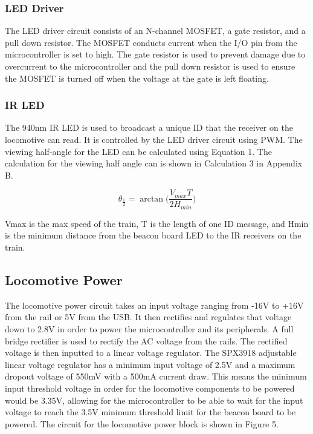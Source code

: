 \documentclass[openbib,letterpaper,10pt]{article}
\begin{document}
\begin{spacing}{1.15}
\subsubsection{LED Driver}
The LED driver circuit consists of an N-channel MOSFET, a gate resistor, and a pull down resistor. The MOSFET conducts current when the I/O pin from the microcontroller is set to high. The gate resistor is used to prevent damage due to overcurrent to the microcontroller and the pull down resistor is used to ensure the MOSFET is turned off when the voltage at the gate is left floating.

\subsubsection{IR LED}
The 940nm IR LED is used to broadcast a unique ID that the receiver on the locomotive can read. It is controlled by the LED driver circuit using PWM. The viewing half-angle for the LED can be calculated using Equation 1. The calculation for the viewing half angle can is shown in Calculation 3 in Appendix B.

\begin{equation}
\theta_{\frac{1}{2}}=\arctan\bigg(\frac{V_{max}T}{2H_{min}}\bigg)
\end{equation}

Vmax is the max speed of the train, T is the length of one ID message, and Hmin is the minimum distance from the beacon board LED to the IR receivers on the train.

\subsection{Locomotive Power}
The locomotive power circuit takes an input voltage ranging from -16V to +16V from the rail or 5V from the USB. It then rectifies and regulates that voltage down to 2.8V in order to power the microcontroller and its peripherals. A full bridge rectifier is used to rectify the AC voltage from the rails. The rectified voltage is then inputted to a linear voltage regulator. The SPX3918 adjustable linear voltage regulator has a minimum input voltage of 2.5V and a maximum dropout voltage of 550mV with a 500mA current draw. This means the minimum input threshold voltage in order for the locomotive components to be powered would be 3.35V, allowing for the microcontroller to be able to wait for the input voltage to reach the 3.5V minimum threshold limit for the beacon board to be powered. The circuit for the locomotive power block is shown in Figure 5.\par


\end{spacing}
\end{document}
